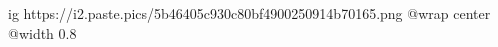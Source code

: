  
 
 
 
 

\ifcmt
  ig https://i2.paste.pics/5b46405c930c80bf4900250914b70165.png
  @wrap center
  @width 0.8
\fi
